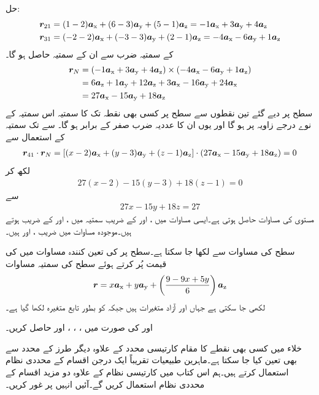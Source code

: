 حل:
\begin{align*}
\kvec{r}_{21}&=(1-2)\ax+(6-3)\ay+(5-1)\az=-1\ax+3\ay+4\az\\
\kvec{r}_{31}&=(-2-2)\ax+(-3-3)\ay+(2-1)\az=-4\ax-6\ay+1\az
\end{align*}
کے سمتیہ ضرب سے ان کے   سمتیہ حاصل ہو گا۔
\begin{align*}
\kvec{r}_N&=(-1\ax+3\ay+4\az) \times (-4\ax-6\ay+1\az)\\
&=6\az+1\ay+12\az+3\ax-16\ay+24\ax\\
&=27\ax-15\ay+18\az
\end{align*}
سطح پر دیے گئے تین نقطوں سے سطح پر کسی بھی نقطہ  تک کا سمتیہ اس  سمتیہ کے نوے درجے زاویہ پر ہو گا اور یوں ان کا عددیہ ضرب صفر کے برابر ہو گا۔ سے  تک سمتیہ  کے استعمال سے
\begin{align*}
\kvec{r}_{41} \cdot \kvec{r}_{N}=[(x-2)\ax+(y-3)\ay+(z-1)\az] \cdot (27\ax-15\ay+18\az)=0
\end{align*}
لکھ کر
\begin{align*}
27(x-2)-15(y-3)+18(z-1)=0
\end{align*}
سے
\begin{align*}
27x-15y+18z=27
\end{align*}
مستوی کی مساوات حاصل ہوتی ہے۔ایسی مساوات میں ،  اور  کے  ضریب    سمتیہ میں ،  اور  کے  ضریب  ہوتے ہیں۔موجودہ مساوات میں  ضریب  ،  اور  ہیں۔

سطح کی مساوات سے  لکھا جا سکتا ہے۔سطح پر  کی تعین کنندہ مساوات  میں  کی قیمت پُر کرتے ہوئے  سطح کی سمتیہ  مساوات 
\begin{align*}
\kvec{r}=x\ax+y\ay+\left(\frac{9-9x+5y}{6}\right)\az
\end{align*}
لکھی جا سکتی ہے جہاں  اور  آزاد متغیرات ہیں جبکہ  کو بطور تابع متغیرہ لکھا گیا ہے۔

 اور  کی صورت میں ، ، ،  اور  حاصل کریں۔ 

خلاء میں کسی بھی نقطے کا مقام کارتیسی محدد کے علاوہ دیگر طرز کے محدد سے بھی تعین کیا جا سکتا ہے۔ماہرین طبیعیات  تقریباً ایک درجن اقسام کے محددی نظام استعمال کرتے ہیں۔ہم اس کتاب میں کارتیسی نظام کے علاوہ دو مزید اقسام کے محددی نظام استعمال کریں گے۔آئیں انہیں پر غور کریں۔ 


